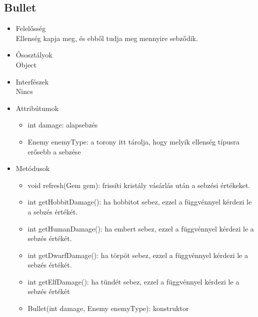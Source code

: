 \subsection{Bullet}
\begin{itemize}
\item Felelősség\\
Ellenség kapja meg, és ebből tudja meg mennyire sebződik.
\item Ősosztályok\\
Object
\item Interfészek\\
Nincs
\item Attribútumok%
	\begin{itemize}
		\item int damage: alapsebzés
		\item Enemy enemyType: a torony itt tárolja, hogy melyik ellenség típusra erősebb a sebzése
	\end{itemize}
\item Metódusok%
	\begin{itemize}
		\item void refresh(Gem gem): frissíti kristály vásárlás után a sebzési értékeket.
		\item int getHobbitDamage(): ha hobbitot sebez, ezzel a függvénnyel kérdezi le a sebzés értékét. 
		\item int getHumanDamage(): ha embert sebez, ezzel a függvénnyel kérdezi le a sebzés értékét.
		\item int getDwarfDamage(): ha törpöt sebez, ezzel a függvénnyel kérdezi le a sebzés értékét.
		\item int getElfDamage(): ha tündét sebez, ezzel a függvénnyel kérdezi le a sebzés értékét
		\item Bullet(int damage, Enemy enemyType): konstruktor
		
		
	\end{itemize}
\end{itemize}


